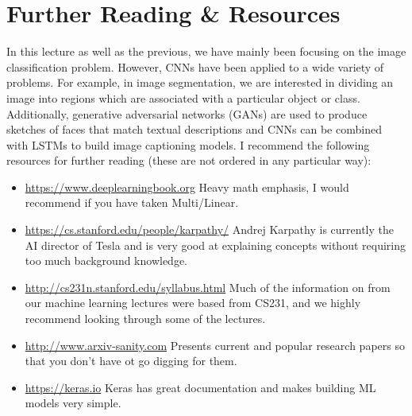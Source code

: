 \documentclass[11pt]{article}
\begin{document}
\section{Further Reading \& Resources}
In this lecture as well as the previous, we have mainly been focusing on the image classification problem. However, CNNs have been applied to a wide variety of problems. For example, in image segmentation, we are interested in dividing an image into regions which are associated with a particular object or class. Additionally, generative adversarial networks (GANs) are used to produce sketches of faces that match textual descriptions and CNNs can be combined with LSTMs to build image captioning models. I recommend the following resources for further reading (these are not ordered in any particular way):
\begin{itemize}
    \item \url{https://www.deeplearningbook.org} \quad Heavy math emphasis, I would recommend if you have taken Multi/Linear.
    \item \url{https://cs.stanford.edu/people/karpathy/} \quad Andrej Karpathy is currently the AI director of Tesla and is very good at explaining concepts without requiring too much background knowledge.
    \item \url{http://cs231n.stanford.edu/syllabus.html} \quad Much of the information on from our machine learning lectures were based from CS231, and we highly recommend looking through some of the lectures.
    \item \url{http://www.arxiv-sanity.com} Presents current and popular research papers so that you don't have ot go digging for them.
    \item \url{https://keras.io} Keras has great documentation and makes building ML models very simple.
\end{itemize}
\end{document}
